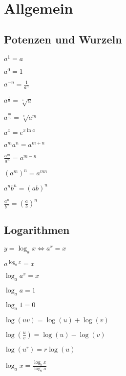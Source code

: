 
\section{Allgemein}

\subsection{Potenzen und Wurzeln}
\begin{compactitem}
    \item 
        \begin{inparaitem}
            \item $a^1 = a$
            \item $a^0 = 1$
        \end{inparaitem}
    \item $a^{-n} = \frac{1}{a^n}$
    \item 
        \begin{inparaitem}
            \item $a^{\frac{1}{n}} = \sqrt[^n]{a}$
            \item $a^{\frac{m}{n}} = \sqrt[^n]{a^m}$
        \end{inparaitem}
    \item $a^x = e^{x \ln a}$
    \item $a^ma^n = a^{m + n}$
    \item $\frac{a^m}{a^n} = a^{m - n}$
    \item $(a^m)^n = a^{m n}$
    \item $a^nb^n = (ab)^n$
    \item $\frac{a^n}{b^n} = \left( \frac{a}{b} \right)^n$
\end{compactitem}

\subsection{Logarithmen}
$y = \log_a x \iff a^x = x$
\begin{compactitem}
    \item $a^{\log_a x} = x$
    \item $\log_a a^x = x$
    \item 
        \begin{inparaitem}
            \item $\log_a a = 1$
            \item $\log_a 1 = 0$
        \end{inparaitem}
    \item $\log(uv) = \log(u) + \log(v)$
    \item $\log(\frac{u}{v}) = \log(u) - \log(v)$
    \item $\log(u^r) = r \log(u)$
    \item $\log_a x = \frac{\log_b x}{\log_b a}$
\end{compactitem}


